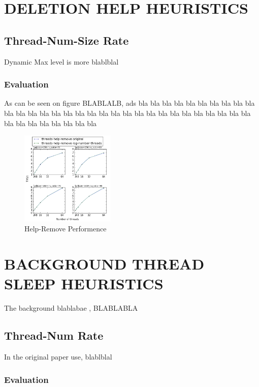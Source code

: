 \documentclass{article}
\begin{document}
\section{DELETION HELP HEURISTICS}
\label{sec:dhh}

\subsection{Thread-Num-Size Rate}
\label{ssec:tns}

Dynamic Max level is more blablblal

\subsubsection{Evaluation}
\label{sssec:tns-evl}

As can be seen on figure BLABLALB, ads
bla bla bla bla bla bla
bla bla bla bla bla 
bla bla bla bla bla bla
bla bla bla bla bla 
bla bla bla bla bla bla
bla bla bla bla bla 
bla bla bla bla bla bla

\begin{figure}
	\caption{Help-Remove Performence}
	\centering
	\includegraphics[width=0.4\textwidth]{help-remove_plot}
\end{figure}

\section{BACKGROUND THREAD SLEEP HEURISTICS}
\label{sec:bts}

The background blablabae , BLABLABLA

\subsection{Thread-Num Rate}
\label{ssec:dsrs}

In the original paper use, blablblal

\subsubsection{Evaluation}
\label{sssec:dsrs-evl}
\end{document}

